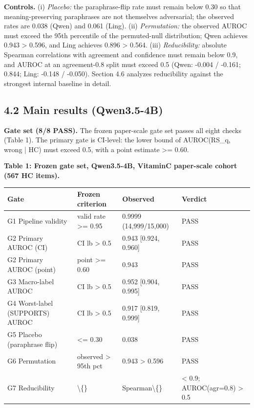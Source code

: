 \documentclass[11pt]{article}
\begin{document}
\textbf{Controls.} (i) \emph{Placebo:} the paraphrase-flip rate must remain below 0.30 so that meaning-preserving paraphrases are not themselves adversarial; the observed rates are 0.038 (Qwen) and 0.061 (Ling). (ii) \emph{Permutation:} the observed AUROC must exceed the 95th percentile of the permuted-null distribution; Qwen achieves 0.943 > 0.596, and Ling achieves 0.896 > 0.564. (iii) \emph{Reducibility:} absolute Spearman correlations with agreement and confidence must remain below 0.9, and AUROC at an agreement-0.8 split must exceed 0.5 (Qwen: -0.004 / -0.161; 0.844; Ling: -0.148 / -0.050). Section 4.6 analyzes reducibility against the strongest internal baseline in detail.

\subsection{4.2 Main results (Qwen3.5-4B)}

\textbf{Gate set (8/8 PASS).} The frozen paper-scale gate set passes all eight checks (Table 1). The primary gate is CI-level: the lower bound of AUROC(RS\_q, wrong | HC) must exceed 0.5, with a point estimate >= 0.60.

\textbf{Table 1: Frozen gate set, Qwen3.5-4B, VitaminC paper-scale cohort (567 HC items).}

\begin{table}[t]
\centering
\small
\begin{tabular}{llll}
\toprule
Gate & Frozen criterion & Observed & Verdict \\
\midrule
G1 Pipeline validity & valid rate >= 0.95 & 0.9999 (14,999/15,000) & PASS \\
G2 Primary AUROC (CI) & CI lb > 0.5 & 0.943 [0.924, 0.960] & PASS \\
G2 Primary AUROC (point) & point >= 0.60 & 0.943 & PASS \\
G3 Macro-label AUROC & CI lb > 0.5 & 0.952 [0.904, 0.995] & PASS \\
G4 Worst-label (SUPPORTS) AUROC & CI lb > 0.5 & 0.917 [0.819, 0.999] & PASS \\
G5 Placebo (paraphrase flip) & <= 0.30 & 0.038 & PASS \\
G6 Permutation & observed > 95th pct & 0.943 > 0.596 & PASS \\
G7 Reducibility & \textbackslash\{\} & Spearman\textbackslash\{\} & < 0.9; AUROC(agr=0.8) > 0.5 \\
\bottomrule
\end{tabular}
\end{table}
\end{document}
